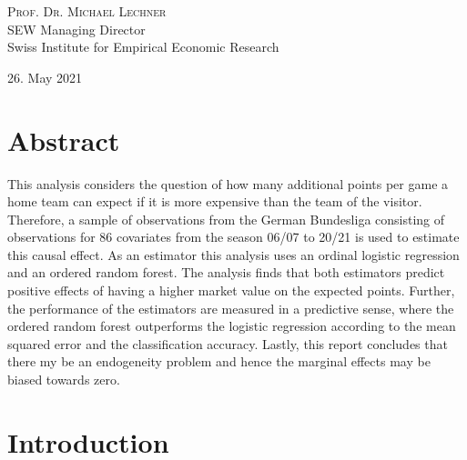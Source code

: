 \documentclass[11pt]{article}
\begin{document}
\begin{titlepage}
	\vfill\vfill\vfill

	{\large\textsc{Prof. Dr. Michael Lechner}}\\
	SEW Managing Director\\
	Swiss Institute for Empirical Economic Research


	\vfill\vfill\vfill

	{\large26. May 2021}

\end{titlepage}


\section*{Abstract}

This analysis considers the question of how many additional points per game a home team can expect if it is more expensive than the team of the visitor. Therefore, a sample of observations from the German Bundesliga consisting of observations for 86 covariates from the season 06/07 to 20/21 is used to estimate this causal effect. As an estimator this analysis uses an ordinal logistic regression and an ordered random forest. The analysis finds that both estimators predict positive effects of having a higher market value on the expected points. Further, the performance of the estimators are measured in a predictive sense, where the ordered random forest outperforms the logistic regression according to the mean squared error and the classification accuracy. Lastly, this report concludes that there my be an endogeneity problem and hence the marginal effects may be biased towards zero.

\pagebreak


\tableofcontents

\pagebreak



\section{Introduction}
\end{document}
